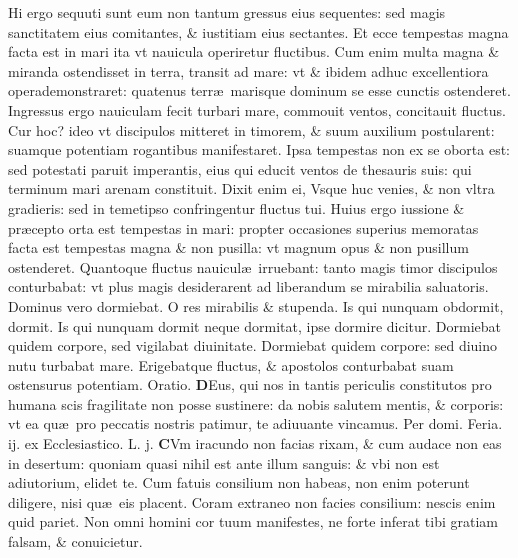 \documentclass[a5paper,10pt]{book}
\def\leftmarginnote{%
	\lrmarginnote{\hskip -\marginparsep \hskip -6.5em}}
\def\ae{æ}
\begin{document}
\begin{multicols*}{2}
Hi ergo sequuti sunt eum non tantum gressus eius sequentes: sed magis sanctitatem eius comitantes, \& iustitiam eius sectantes.
Et ecce tempestas magna facta est in mari ita vt nauicula operiretur fluctibus. Cum enim multa magna \& miranda ostendisset in terra, transit ad mare: vt \& ibidem adhuc excellentiora operademonstraret: quatenus terr\ae \ marisque dominum se esse cunctis ostenderet.
Ingressus ergo nauiculam fecit turbari mare, commouit ventos, concitauit fluctus. Cur hoc? ideo vt discipulos mitteret in timorem, \& suum auxilium postularent: suamque potentiam rogantibus manifestaret.
Ipsa tempestas non ex se oborta est: sed potestati paruit imperantis, eius qui educit ventos de thesauris suis: qui terminum mari arenam constituit.
Dixit enim ei, Vsque huc venies, \& non vltra gradieris: sed in temetipso confringentur fluctus
tui. Huius ergo iussione \& pr\ae cepto orta est tempestas in mari: propter occasiones superius memoratas facta est tempestas magna \& non pusilla: vt magnum opus \& non pusillum ostenderet.
Quantoque fluctus nauicul\ae \ irruebant: tanto magis timor discipulos conturbabat: vt plus magis desiderarent ad liberandum se mirabilia saluatoris.
Dominus vero dormiebat. O res mirabilis \& stupenda. Is qui nunquam obdormit, dormit. Is qui nunquam dormit neque dormitat, ipse dormire dicitur.
Dormiebat quidem corpore, sed vigilabat diuinitate. Dormiebat quidem corpore: sed diuino nutu turbabat mare. Erigebatque fluctus, \& apostolos conturbabat suam ostensurus potentiam. \color{red} Oratio.\color{black}
\vspace{-.25em}
\lettrine[lines=2]{\bfseries \color{red} D}{}Eus, qui nos in tantis periculis constitutos pro humana scis fragilitate non posse sustinere: da nobis salutem mentis, \& corporis: vt ea qu\ae \ pro peccatis nostris patimur, te adiuuante vincamus. Per domi.
\newline {} \color{red} \hypertarget{MON-TERTIA-VAGAN}{Feria. ij.} ex Ecclesiastico. \quad L. j. \color{black}
\vspace{-.25em}
\lettrine[lines=2]{\bfseries \color{red} C}{}Vm\leftmarginnote{\begin{flushright}ca. 8.\end{flushright}} iracundo non facias rixam, \& cum audace non eas in desertum: quoniam quasi nihil est ante illum sanguis: \& vbi non est adiutorium, elidet te.
Cum fatuis consilium non habeas, non enim poterunt diligere, nisi qu\ae \ eis placent.
Coram extraneo non facies consilium: nescis enim quid pariet. Non omni homini cor tuum manifestes, ne forte inferat tibi gratiam falsam, \& conuicietur.

\end{multicols*}
\end{document}
